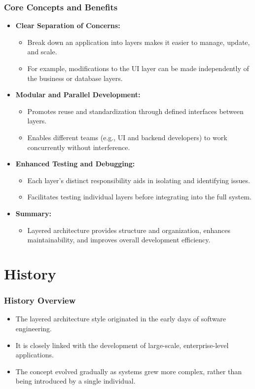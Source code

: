 \documentclass[aspectratio=169, table]{beamer}
\begin{document}
\begin{frame}
	\frametitle{Core Concepts and Benefits}
	\vspace{20pt}
	\begin{itemize}
		\item \textbf{Clear Separation of Concerns:}
		\begin{itemize}
			\item Break down an application into layers makes it easier to manage, update, and scale.
			\item For example, modifications to the UI layer can be made independently of the business or database layers.
		\end{itemize}
		\item \textbf{Modular and Parallel Development:}
		\begin{itemize}
			\item Promotes reuse and standardization through defined interfaces between layers.
			\item Enables different teams (e.g., UI and backend developers) to work concurrently without interference.
		\end{itemize}
		\item \textbf{Enhanced Testing and Debugging:}
		\begin{itemize}
			\item Each layer’s distinct responsibility aids in isolating and identifying issues.
			\item Facilitates testing individual layers before integrating into the full system.
		\end{itemize}
		\item \textbf{Summary:}
		\begin{itemize}
			\item Layered architecture provides structure and organization, enhances maintainability, and improves overall development efficiency.
		\end{itemize}
	\end{itemize}
\end{frame}

\section{History}

\begin{frame}
	\frametitle{History Overview}
	\begin{itemize}
		\item The layered architecture style originated in the early days of software engineering.
		\item It is closely linked with the development of large-scale, enterprise-level applications.
		\item The concept evolved gradually as systems grew more complex, rather than being introduced by a single individual.
	\end{itemize}
\end{frame}
\end{document}
